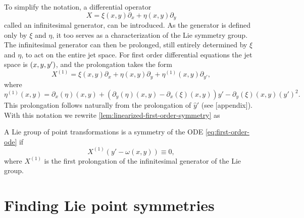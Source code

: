 To simplify the notation, a differential operator
\begin{equation}
  X = \xi(x,y) \partial_x + \eta(x,y) \partial_y
\end{equation}
called an infinitesimal generator, can be introduced.
As the generator is defined only by \(\xi\) and \(\eta\), it too serves as a characterization of the Lie symmetry group.
The infinitesimal generator can then be prolonged, still entirely determined by \(\xi\) and \(\eta\), to act on the entire jet space.
For first order differential equations the jet space is \(\pqty{x, y, y'}\), and the prolongation takes the form
\begin{equation}
  X^{(1)} = \xi(x,y) \partial_x + \eta(x,y) \partial_y + \eta^{(1)}(x,y) \partial_{y'},
\end{equation}
where
\begin{equation}
  \eta^{(1)}(x,y) =
  \partial_x(\eta)(x,y) + (\partial_y(\eta)(x,y) - \partial_x(\xi)(x,y)) y' - \partial_y(\xi)(x,y) \left(y'\right)^2.
\end{equation}
This prolongation follows naturally from the prolongation of \(\hat{y}'\) (see [appendix]). %
With this notation we rewrite \cref{lem:linearized-first-order-symmetry} as
\begin{thm} \label{thm:linearized-first-order-symmetry}
  A Lie group of point transformations is a symmetry of the ODE \ref{eq:first-order-ode} if
  \begin{equation} \label{eq:linearized-first-order-symmetry}
    X^{(1)}\left(y' - \omega(x,y)\right) \equiv 0,
  \end{equation}
  where \(X^{(1)}\) is the first prolongation of the infinitesimal generator of the Lie group.
\end{thm} %

\section{Finding Lie point symmetries}

